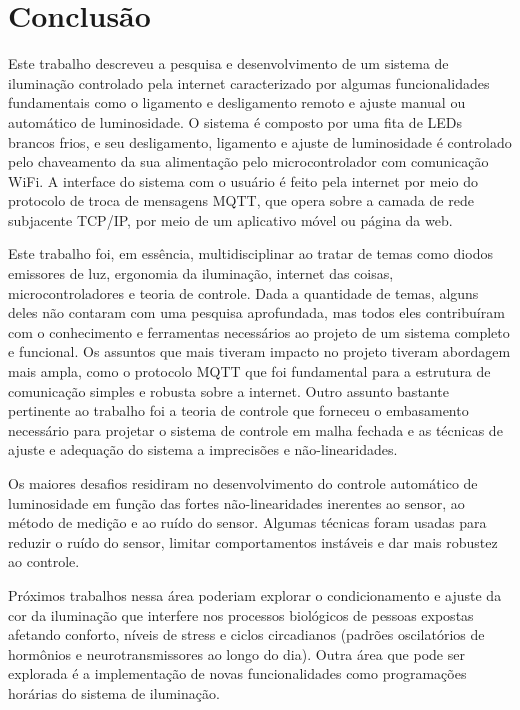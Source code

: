 \chapter{Conclusão}

Este trabalho descreveu a pesquisa e desenvolvimento de um sistema de iluminação controlado pela internet caracterizado por algumas funcionalidades fundamentais como o ligamento e desligamento remoto e ajuste manual ou automático de luminosidade. O sistema é composto por uma fita de LEDs brancos frios, e seu desligamento, ligamento e ajuste de luminosidade é controlado pelo chaveamento da sua alimentação pelo microcontrolador com comunicação WiFi. A interface do sistema com o usuário é feito pela internet por meio do protocolo de troca de mensagens MQTT, que opera sobre a camada de rede subjacente TCP/IP, por meio de um aplicativo móvel ou página da web.

Este trabalho foi, em essência, multidisciplinar ao tratar de temas como diodos emissores de luz, ergonomia da iluminação, internet das coisas, microcontroladores e teoria de controle. Dada a quantidade de temas, alguns deles não contaram com uma pesquisa aprofundada, mas todos eles contribuíram com o conhecimento e ferramentas necessários ao projeto de um sistema completo e funcional. Os assuntos que mais tiveram impacto no projeto tiveram abordagem mais ampla, como o protocolo MQTT que foi fundamental para a estrutura de comunicação simples e robusta sobre a internet. Outro assunto bastante pertinente ao trabalho foi a teoria de controle que forneceu o embasamento necessário para projetar o sistema de controle em malha fechada e as técnicas de ajuste e adequação do sistema a imprecisões e não-linearidades.

Os maiores desafios residiram no desenvolvimento do controle automático de luminosidade em função das fortes não-linearidades inerentes ao sensor, ao método de medição e ao ruído do sensor. Algumas técnicas foram usadas para reduzir o ruído do sensor, limitar comportamentos instáveis e dar mais robustez ao controle. 

Próximos trabalhos nessa área poderiam explorar o condicionamento e ajuste da cor da iluminação que interfere nos processos biológicos de pessoas expostas afetando conforto, níveis de stress e ciclos circadianos (padrões oscilatórios de hormônios e neurotransmissores ao longo do dia). Outra área que pode ser explorada é a implementação de novas funcionalidades como programações horárias do sistema de iluminação.